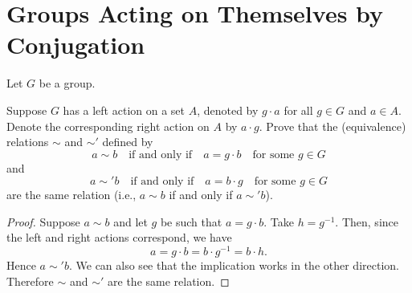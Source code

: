 \section{Groups Acting on Themselves by Conjugation}

Let $G$ be a group.

 Suppose $G$ has a left action on a set $A$, denoted by
$g\cdot a$ for all $g\in G$ and $a\in A$. Denote the corresponding
right action on $A$ by $a\cdot g$. Prove that the (equivalence)
relations $\sim$ and $\sim'$ defined by
\begin{equation*}
  a\sim b \quad\text{if and only if}\quad a = g\cdot b
  \quad\text{for some $g\in G$}
\end{equation*}
and
\begin{equation*}
  a\sim'b \quad\text{if and only if}\quad a = b\cdot g
  \quad\text{for some $g\in G$}
\end{equation*}
are the same relation (i.e., $a\sim b$ if and only if $a\sim'b$).
\begin{proof}
  Suppose $a\sim b$ and let $g$ be such that $a = g\cdot b$. Take
  $h = g^{-1}$. Then, since the left and right actions correspond, we
  have
  \begin{equation*}
    a = g\cdot b = b\cdot g^{-1} = b\cdot h.
  \end{equation*}
  Hence $a\sim' b$. We can also see that the implication works in the
  other direction. Therefore $\sim$ and $\sim'$ are the same relation.
\end{proof}

